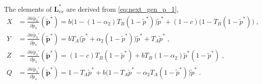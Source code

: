 \documentclass[12pt]{extarticle}
\let\vec\mathbf
\begin{document}
\begin{appendices}
The elements of $\mathbf{L}^*_{ex}$ are derived from \autoref{eq:next_gen_p_1},
\begin{equation} \label{eq:partial_derivatives}
  \begin{aligned}
  X &= \frac{\partial\bar{w}\tilde{p}_3'}{\partial \tilde{p}_3}(\vec{\tilde{p}}^*) = b \big(1-(1 - \alpha_2) T_B (1 - \tilde{p}^*)\big) \tilde{p}^* + (1 - c) \big(1 - T_B (1 - \tilde{p}^*)\big) \;,\\
  Y &= \frac{\partial\bar{w}\tilde{p}_3'}{\partial \tilde{p}_4}(\vec{\tilde{p}}^*) = b T_A \big(\tilde{p}^* + \alpha_2 (1 - \tilde{p}^*)\big) \tilde{p}^* + T_A \tilde{p}^* \;,\\
  Z &= \frac{\partial\bar{w}\tilde{p}_4'}{\partial \tilde{p}_3}(\vec{\tilde{p}}^*) = (1 - c) T_B (1 - \tilde{p}^*) + b T_B (1 - \alpha_2) \tilde{p}^*(1 - \tilde{p}^*) \;,\\
  Q &= \frac{\partial\bar{w}\tilde{p}_4'}{\partial \tilde{p}_4}(\vec{\tilde{p}}^*) = 1 - T_A \tilde{p}^* + b \big(1 - T_A \tilde{p}^* - \alpha_2 T_A (1 - \tilde{p}^*) \big) \tilde{p}^* \;.
  \end{aligned}
\end{equation}


\end{appendices}
\end{document}
